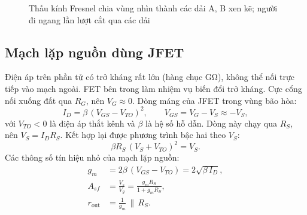 \begin{figure}[!htb]
\centering
{}
\caption{Thấu kính Fresnel chia vùng nhìn thành các dải A, B xen kẽ; người đi ngang lần lượt cắt qua các dải}
\label{fig:fresnel}
\end{figure}

\subsection{Mạch lặp nguồn dùng JFET}
\label{sec:jfet}

Điện áp trên phần tử có trở kháng rất lớn (hàng chục GΩ), không thể nối trực tiếp vào mạch ngoài. FET bên trong làm nhiệm vụ biến đổi trở kháng. Cực cổng nối xuống đất qua $R_G$, nên $V_G \approx 0$. Dòng máng của JFET trong vùng bão hòa:
\begin{equation}
  I_D = \beta\,(V_{GS} - V_{TO})^2 ,\qquad V_{GS} = V_G - V_S \approx -V_S ,
  \label{eq:jfetid}
\end{equation}
với $V_{TO} < 0$ là điện áp thắt kênh và $\beta$ là hệ số hỗ dẫn. Dòng này chạy qua $R_S$, nên $V_S = I_D R_S$. Kết hợp lại được phương trình bậc hai theo $V_S$:
\begin{equation}
  \beta R_S\,(V_S + V_{TO})^2 = V_S .
  \label{eq:jfetvs}
\end{equation}
Các thông số tín hiệu nhỏ của mạch lặp nguồn:
\begin{align}
  g_m &= 2\beta\,(V_{GS} - V_{TO}) = 2\sqrt{\beta\,I_D}, \label{eq:gm}\\
  A_{sf} &= \frac{V_s}{V_g} = \frac{g_m R_S}{1+g_m R_S}, \label{eq:Asf}\\
  r_\text{out} &= \frac{1}{g_m}\,\Big\|\,R_S . \label{eq:rout}
\end{align}

